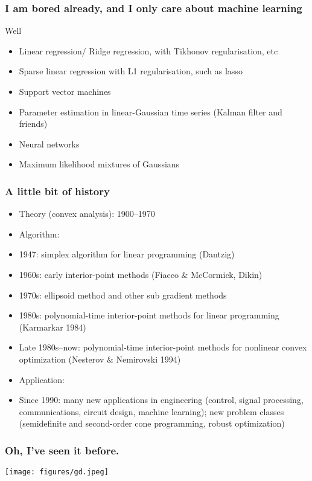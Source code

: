 \documentclass[10pt,mathserif]{beamer}
\begin{document}
\begin{frame}\frametitle{I am bored already, and I only care about machine learning}
\begin{block}{Well}
\begin{itemize}
\item Linear regression/ Ridge regression, with Tikhonov regularisation, etc
\item Sparse linear regression with L1 regularisation, such as lasso
\item Support vector machines
\item Parameter estimation in linear-Gaussian time series (Kalman filter and friends)
\item Neural networks
\item Maximum likelihood mixtures of Gaussians
\end{itemize}
\end{block}
\end{frame}



\begin{frame}\frametitle{A little bit of history}
\begin{itemize}
\item Theory (convex analysis): 1900–1970
\item Algorithm: 
\item 1947: simplex algorithm for linear programming (Dantzig)
\item 1960s: early interior-point methods (Fiacco $\&$ McCormick, Dikin)
\item 1970s: ellipsoid method and other sub gradient methods
\item 1980s: polynomial-time interior-point methods for linear programming (Karmarkar 1984)
\item Late 1980s–now: polynomial-time interior-point methods for nonlinear convex optimization (Nesterov $\&$ Nemirovski 1994)
\item Application:
\item Since 1990: many new applications in engineering (control, signal processing, communications, circuit design, machine learning); new problem classes (semidefinite and second-order cone programming, robust optimization)

\end{itemize}

\end{frame}
\begin{frame}\frametitle{Oh, I've seen it before.}
\begin{center}
\texttt{[image: figures/gd.jpeg]}
\end{center}

\end{frame}
\end{document}
